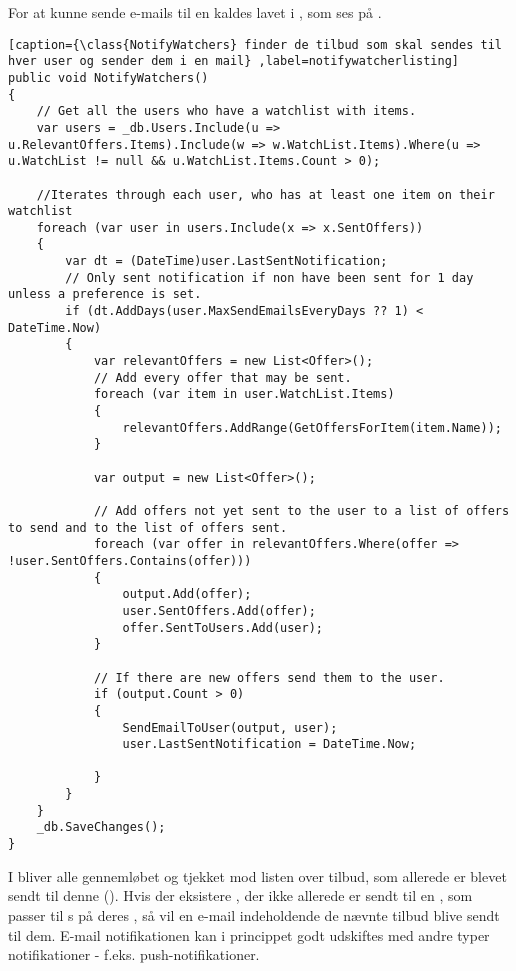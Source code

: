 For at kunne sende e-mails til en  kaldes  lavet i , som ses på . 
\begin{lstlisting}[caption={\class{NotifyWatchers} finder de tilbud som skal sendes til hver user og sender dem i en mail} ,label=notifywatcherlisting]
public void NotifyWatchers()
{
    // Get all the users who have a watchlist with items.
    var users = _db.Users.Include(u => u.RelevantOffers.Items).Include(w => w.WatchList.Items).Where(u => u.WatchList != null && u.WatchList.Items.Count > 0);

	//Iterates through each user, who has at least one item on their watchlist
    foreach (var user in users.Include(x => x.SentOffers))
    {
        var dt = (DateTime)user.LastSentNotification;
        // Only sent notification if non have been sent for 1 day unless a preference is set.
        if (dt.AddDays(user.MaxSendEmailsEveryDays ?? 1) < DateTime.Now)
        {
            var relevantOffers = new List<Offer>();
            // Add every offer that may be sent. 
            foreach (var item in user.WatchList.Items)
            {
                relevantOffers.AddRange(GetOffersForItem(item.Name));
            }

            var output = new List<Offer>();

            // Add offers not yet sent to the user to a list of offers to send and to the list of offers sent.
            foreach (var offer in relevantOffers.Where(offer => !user.SentOffers.Contains(offer)))
            {
                output.Add(offer);
                user.SentOffers.Add(offer);
                offer.SentToUsers.Add(user);
            }

            // If there are new offers send them to the user.
            if (output.Count > 0)
            {
                SendEmailToUser(output, user);
                user.LastSentNotification = DateTime.Now;

            }
        }
    }
    _db.SaveChanges();
}
\end{lstlisting}
I  bliver alle   gennemløbet og tjekket mod listen over tilbud, som allerede er blevet sendt til denne  (). 
Hvis der eksistere , der ikke allerede er sendt til en , som passer til s på deres , så vil en e-mail indeholdende de nævnte tilbud blive sendt til dem. 
E-mail notifikationen kan i princippet godt udskiftes med andre typer notifikationer - f.eks. push-notifikationer. 

